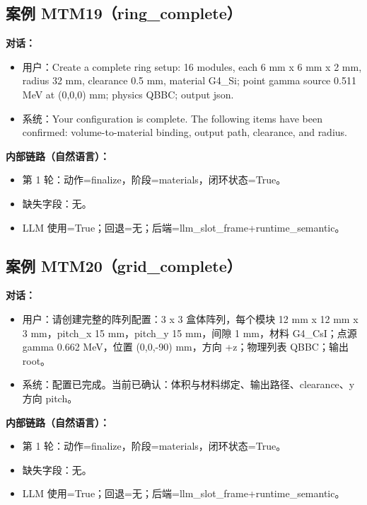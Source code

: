 \documentclass[11pt]{ctexart}
\begin{document}
\subsection{案例 MTM19（ring\_complete）}
\textbf{对话：}
\begin{itemize}
\item 用户：Create a complete ring setup: 16 modules, each 6 mm x 6 mm x 2 mm, radius 32 mm, clearance 0.5 mm, material G4\_Si; point gamma source 0.511 MeV at (0,0,0) mm; physics QBBC; output json.
\item 系统：Your configuration is complete. The following items have been confirmed: volume-to-material binding, output path, clearance, and radius.
\end{itemize}
\textbf{内部链路（自然语言）：}
\begin{itemize}
\item 第 1 轮：动作=finalize，阶段=materials，闭环状态=True。
\item 缺失字段：无。
\item LLM 使用=True；回退=无；后端=llm\_slot\_frame+runtime\_semantic。
\end{itemize}
\subsection{案例 MTM20（grid\_complete）}
\textbf{对话：}
\begin{itemize}
\item 用户：请创建完整的阵列配置：3 x 3 盒体阵列，每个模块 12 mm x 12 mm x 3 mm，pitch\_x 15 mm，pitch\_y 15 mm，间隙 1 mm，材料 G4\_CsI；点源 gamma 0.662 MeV，位置 (0,0,-90) mm，方向 +z；物理列表 QBBC；输出 root。
\item 系统：配置已完成。当前已确认：体积与材料绑定、输出路径、clearance、y 方向 pitch。
\end{itemize}
\textbf{内部链路（自然语言）：}
\begin{itemize}
\item 第 1 轮：动作=finalize，阶段=materials，闭环状态=True。
\item 缺失字段：无。
\item LLM 使用=True；回退=无；后端=llm\_slot\_frame+runtime\_semantic。
\end{itemize}
\end{document}

